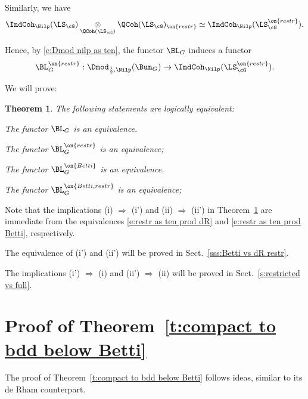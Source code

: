 \documentclass[9pt]{amsart}
\newtheorem{thm}[subsubsection]{Theorem}
\theoremstyle{remark}
\theoremstyle{definition}
\theoremstyle{remark}
\newcommand{\thmref}[1]{Theorem~\ref{#1}}
\newcommand{\secref}[1]{Sect.~\ref{#1}}
\numberwithin{equation}{section}
\begin{document}
\sssec{}

Similarly, we have
\begin{equation} \label{e:restr as ten prod dR}
\IndCoh_\Nilp(\LS_\cG)\underset{\QCoh(\LS_\cG)}\otimes \QCoh(\LS_\cG)_{\on{restr}}\simeq
\IndCoh_\Nilp(\LS^{\on{restr}}_\cG).
\end{equation} 

Hence, by \eqref{e:Dmod nilp as ten}, the functor $\BL_G$ induces a functor
$$\BL_G^{\on{restr}}:\Dmod_{\frac{1}{2},\Nilp}(\Bun_G) \to \IndCoh_\Nilp(\LS^{\on{restr}}_\cG).$$

\sssec{}

We will prove: 

\begin{thm} \label{t:dR => Betti bis} 
The following statements are logically equivalent:

\smallskip

 The functor $\BL_G$ is an equivalence.

\smallskip

 The functor $\BL_G^{\on{restr}}$ is an equivalence;

\smallskip

 The functor $\BL^{\on{Betti}}_G$ is an equivalence.

\smallskip

 The functor $\BL_G^{\on{Betti,restr}}$ is an equivalence;

\end{thm} 

Note that the implications (i) $\Rightarrow$ (i') and (ii) $\Rightarrow$ (ii') in \thmref{t:dR => Betti bis}
are immediate from the equivalences \eqref{e:restr as ten prod dR} and \eqref{e:restr as ten prod Betti}, respectively. 

\medskip

The equivalence of (i') and (ii') will be proved in \secref{sss:Betti vs dR restr}.

\medskip

The implications (i') $\Rightarrow$ (i) and (ii') $\Rightarrow$ (ii) will be proved in
\secref{s:restricted vs full}. 

\section{Proof of \thmref{t:compact to bdd below Betti}}  \label{s:proof of Betti >0}

The proof of \thmref{t:compact to bdd below Betti} follows ideas, similar to its
de Rham counterpart.
\end{document}
